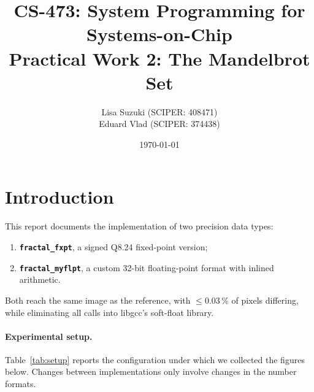 \documentclass[10pt,a4paper]{article}
\title{\vspace{-1.2cm}\textbf{CS-473: System Programming for Systems-on-Chip}\\[2mm]
       \large Practical Work 2: The Mandelbrot Set}
\author{%
  Lisa Suzuki \quad (SCIPER: 408471) \\
  Eduard Vlad \quad (SCIPER: 374438)%
}
\date{\today}
\newcommand{\Q}[2]{Q#1.#2}
\begin{document}
\maketitle
\vspace{-6mm}

\section{Introduction}

This report documents the implementation of two precision data types:
\begin{enumerate}\itemsep0pt
  \item \textbf{\texttt{fractal\_fxpt}}, a signed \Q{8}{24} fixed-point version;
  \item \textbf{\texttt{fractal\_myflpt}}, a custom 32-bit floating-point format with
        inlined arithmetic.
\end{enumerate}

Both reach the same image as the reference, with $\le 0.03\,\%$ of pixels differing, while
eliminating all calls into libgcc's soft-float library.

\paragraph{Experimental setup.} 
Table~\ref{tab:setup} reports the configuration under which we collected the figures below.
Changes between implementations only involve changes in the number formats.
\end{document}
